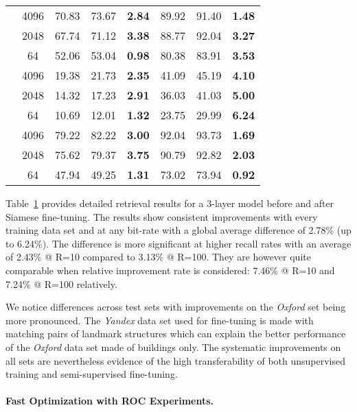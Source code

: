 \documentclass[10pt,twocolumn,letterpaper]{article}
\begin{document}
\begin{table}[h]
{\begin{tabular}{|c|c|c|c|c|c|c|c|}
	\hline
	\multirow{3}{*}{\rotatebox[origin=c]{90}{Holidays}} & 4096 & 70.83 & 73.67 & \bf{2.84} & 89.92 & 91.40 &\bf{1.48}\\
	\cline{2-8}
	& 2048 & 67.74 & 71.12 & \bf{3.38} & 88.77 & 92.04 &\bf{3.27}\\
	\cline{2-8}
	& 64 & 52.06 & 53.04 & \bf{0.98} & 80.38 & 83.91 &\bf{3.53}\\
	\hline
	\multirow{3}{*}{\rotatebox[origin=c]{90}{Oxford}} & 4096 & 19.38 & 21.73 & \bf{2.35} & 41.09 & 45.19 &\bf{4.10}\\
	\cline{2-8}
	& 2048 & 14.32 & 17.23 & \bf{2.91} & 36.03 & 41.03 &\bf{5.00}\\
	\cline{2-8}
	& 64 & 10.69 & 12.01 & \bf{1.32} & 23.75 & 29.99 &\bf{6.24}\\
	\hline
	\multirow{3}{*}{\rotatebox[origin=c]{90}{UKB}} & 4096 & 79.22 & 82.22 & \bf{3.00} & 92.04 & 93.73 &\bf{1.69}\\
	\cline{2-8}
	& 2048 & 75.62 & 79.37 & \bf{3.75} & 90.79 & 92.82 &\bf{2.03}\\
	\cline{2-8}
	& 64 & 47.94 & 49.25 & \bf{1.31} & 73.02 & 73.94 &\bf{0.92}\\
	\hline
\end{tabular}
}
\label{table:finetuningres}
\end{table}

Table~\ref{table:finetuningres} provides detailed retrieval results for a 3-layer model before and after Siamese fine-tuning.
The results show consistent improvements with every training data set and at any bit-rate with a global average difference of 2.78\% (up to 6.24\%).  
The difference is more significant at higher recall rates with an average of 2.43\% @ R=10 compared to 3.13\% @ R=100.
They are however quite comparable when relative improvement rate is considered: 7.46\% @ R=10 and 7.24\% @ R=100 relatively. 

We notice differences across test sets with improvements on the {\it Oxford} set being more pronounced.
The {\it Yandex} data set used for fine-tuning is made with matching pairs of landmark structures which can explain the better performance of the {\it Oxford} data set made of buildings only.
The systematic improvements on all sets are nevertheless evidence of the high transferability of both unsupervised training and semi-supervised fine-tuning.

\vspace{-0.1em}
\paragraph{Fast Optimization with ROC Experiments.}
\end{document}
